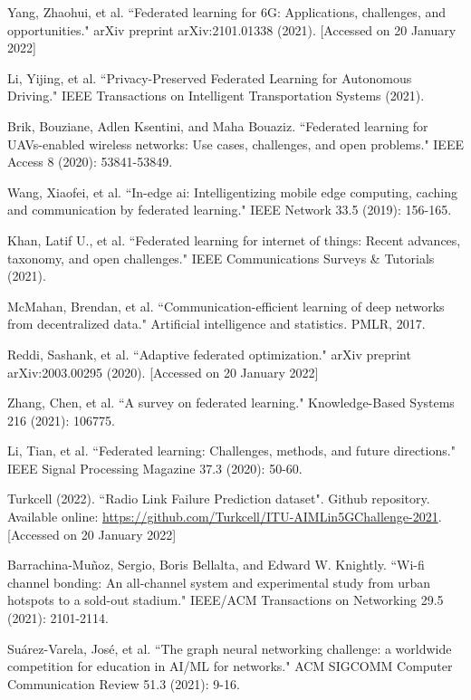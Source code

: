 \documentclass[10pt,a4paper,twocolumn]{article}
\newcommand{\ITUurl}[1]{\textcolor{blue}{\urlstyle{same}\url{#1}}}
\begin{document}
\begin{thebibliography}{9}
 Yang, Zhaohui, et al. ``Federated learning for 6G: Applications, challenges, and opportunities." arXiv preprint arXiv:2101.01338 (2021). [Accessed on 20 January 2022] 

 Li, Yijing, et al. ``Privacy-Preserved Federated Learning for Autonomous Driving." IEEE Transactions on Intelligent Transportation Systems (2021).

 Brik, Bouziane, Adlen Ksentini, and Maha Bouaziz. ``Federated learning for UAVs-enabled wireless networks: Use cases, challenges, and open problems." IEEE Access 8 (2020): 53841-53849.

 Wang, Xiaofei, et al. ``In-edge ai: Intelligentizing mobile edge computing, caching and communication by federated learning." IEEE Network 33.5 (2019): 156-165.

 Khan, Latif U., et al. ``Federated learning for internet of things: Recent advances, taxonomy, and open challenges." IEEE Communications Surveys \& Tutorials (2021).

 McMahan, Brendan, et al. ``Communication-efficient learning of deep networks from decentralized data." Artificial intelligence and statistics. PMLR, 2017.

 Reddi, Sashank, et al. ``Adaptive federated optimization." arXiv preprint arXiv:2003.00295 (2020). [Accessed on 20 January 2022] 

 Zhang, Chen, et al. ``A survey on federated learning." Knowledge-Based Systems 216 (2021): 106775.

 Li, Tian, et al. ``Federated learning: Challenges, methods, and future directions." IEEE Signal Processing Magazine 37.3 (2020): 50-60.

 Turkcell (2022). ``Radio Link Failure Prediction dataset". Github repository. Available online: \ITUurl{ https://github.com/Turkcell/ITU-AIMLin5GChallenge-2021}. [Accessed on 20 January 2022] 

 Barrachina-Muñoz, Sergio, Boris Bellalta, and Edward W. Knightly. ``Wi-fi channel bonding: An all-channel system and experimental study from urban hotspots to a sold-out stadium." IEEE/ACM Transactions on Networking 29.5 (2021): 2101-2114.

 Suárez-Varela, José, et al. ``The graph neural networking challenge: a worldwide competition for education in AI/ML for networks." ACM SIGCOMM Computer Communication Review 51.3 (2021): 9-16.


\end{thebibliography}
\end{document}
